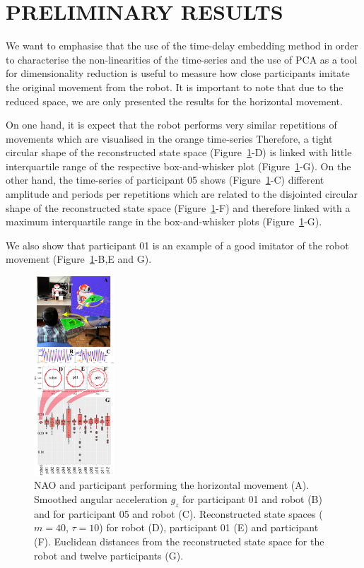 \documentclass{sig-alternate-05-2015}
\begin{document}
\section{PRELIMINARY RESULTS}



We want to emphasise that the use of the time-delay embedding 
method in order to characterise the non-linearities of the time-series 
and the use of PCA as a tool for dimensionality 
reduction is useful to measure how close participants 
imitate the original movement from the robot.
It is important to note that due to the reduced space, we are only presented
the results for the horizontal movement.

On one hand, it is expect that the robot performs very similar repetitions of movements 
which are visualised in the orange time-series
Therefore, a tight circular  shape of the reconstructed state space (Figure~\ref{fig:main}-D)
is linked with little interquartile range of the respective box-and-whisker plot  (Figure~\ref{fig:main}-G).
On the other hand, 
the time-series of participant 05 shows (Figure~\ref{fig:main}-C)
 different amplitude and periods per repetitions which
are related to the disjointed circular shape of 
the reconstructed state space (Figure~\ref{fig:main}-F) and therefore 
linked with a maximum interquartile range in the  box-and-whisker plots  (Figure~\ref{fig:main}-G).

We also show that participant 01 is an example of a good imitator of the robot movement
(Figure~\ref{fig:main}-B,E and G).




\begin{figure}[ht]
\centering
\includegraphics[width=0.27\textwidth]{fig06}
\caption{
NAO and participant performing the horizontal movement (A). 
Smoothed angular acceleration $g_z$ for participant 01  and robot (B)
and for participant 05 and robot (C).
Reconstructed state spaces  ($m=40$, $\tau=10$) for robot (D), participant 01 (E) and participant (F).
Euclidean distances from the reconstructed state space for the robot and twelve participants (G).
}
\label{fig:main}
\end{figure}
\end{document}
